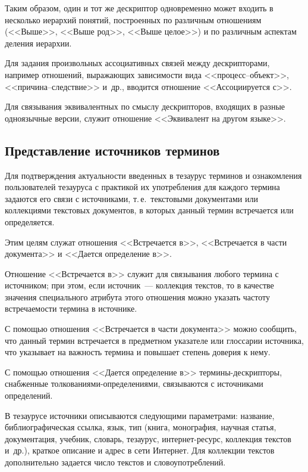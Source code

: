 \begin{multicols}{2}
  Таким образом, один и тот же дескриптор одновременно может входить в несколько 
иерархий понятий, построенных по различным отношениям (<<Выше>>, <<Выше род>>, 
<<Выше целое>>) и по различным аспектам деления иерархии. 
  
  Для задания произвольных ассоциативных связей между дескрипторами, например 
отношений, выражающих зависимости вида <<процесс--объект>>, <<причина--следствие>> 
и~др., вводится отношение <<Ассоциируется с>>.
  
  Для связывания эквивалентных по смыслу дескрипторов, входящих в разные 
одноязычные версии, служит отношение <<Эквивалент на другом \mbox{языке}>>. 

\subsection{Представление источников терминов}

  Для подтверждения актуальности введенных в тезаурус терминов и ознакомления 
пользователей тезауруса с практикой их употребления для каждого термина задаются его 
связи с источниками, т.\,е.\ текстовыми документами или коллекциями текстовых 
документов, в которых данный термин встречается или определяется.
  
   Этим целям служат отношения <<Встречается в>>, <<Встречается в части документа>> и 
<<Дается определение в>>.
  
  Отношение <<Встречается в>> служит для связывания любого термина с источником; при 
этом, если источник~--- коллекция текстов, то в качестве значения специального атрибута 
этого отношения можно указать частоту встречаемости термина в источнике.
  
  С помощью отношения <<Встречается в части документа>> можно сообщить, что данный 
термин встречается в предметном указателе или глоссарии источника, что указывает на 
важность термина и повышает степень доверия к нему. 
  
  С помощью отношения <<Дается определение в>> термины-дескрипторы, снабженные 
толкованиями-определениями, связываются с источниками определений.
  
  В тезаурусе источники описываются сле\-ду\-ющи\-ми параметрами: название, 
библиографическая ссылка, язык, тип (книга, монография, научная статья, документация, 
учебник, словарь, тезаурус, интернет-ресурс, коллекция текстов и~др.), краткое описание и 
адрес в сети Интернет. Для коллекции текстов дополнительно задается число текстов и 
словоупотреблений.


\end{multicols}
